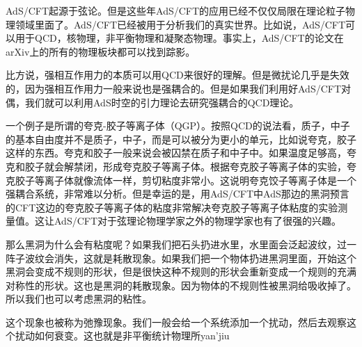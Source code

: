 
AdS/CFT起源于弦论。但是这些年AdS/CFT的应用已经不仅仅局限在理论粒子物理领域里面了。AdS/CFT已经被用于分析我们的真实世界。比如说，AdS/CFT可以用于QCD，核物理，非平衡物理和凝聚态物理。事实上，AdS/CFT的论文在arXiv上的所有的物理板块都可以找到踪影。

比方说，强相互作用力的本质可以用QCD来很好的理解。但是微扰论几乎是失效的，因为强相互作用力一般来说也是强耦合的。但是如果我们利用好AdS/CFT对偶，我们就可以利用AdS时空的引力理论去研究强耦合的QCD理论。

一个例子是所谓的夸克-胶子等离子体（QGP）。按照QCD的说法看，质子，中子的基本自由度并不是质子，中子，而是可以被分为更小的单元，比如说夸克，胶子这样的东西。夸克和胶子一般来说会被囚禁在质子和中子中。如果温度足够高，夸克和胶子就会解禁闭，形成夸克胶子等离子体。根据夸克胶子等离子体的实验，夸克胶子等离子体就像流体一样，剪切粘度非常小。这说明夸克饺子等离子体是一个强耦合系统，非常难以分析。但是幸运的是，用AdS/CFT中AdS那边的黑洞预言的CFT这边的夸克胶子等离子体的粘度非常解决夸克胶子等离子体粘度的实验测量值。这让AdS/CFT对于弦理论物理学家之外的物理学家也有了很强的兴趣。

那么黑洞为什么会有粘度呢？如果我们把石头扔进水里，水里面会泛起波纹，过一阵子波纹会消失，这就是耗散现象。如果我们把一个物体扔进黑洞里面，开始这个黑洞会变成不规则的形状，但是很快这种不规则的形状会重新变成一个规则的充满对称性的形状。这也是黑洞的耗散现象。因为物体的不规则性被黑洞给吸收掉了。所以我们也可以考虑黑洞的粘性。

这个现象也被称为弛豫现象。我们一般会给一个系统添加一个扰动，然后去观察这个扰动如何衰变。这也就是非平衡统计物理所yan'jiu